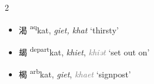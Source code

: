 \begin{multicols}{2}
\begin{itemize}


  \item {\Large{渴}} %
    {\large{{\textsuperscript{aq}}kat}},
    \textit{giet, khat} `thirsty' %



  \item {\Large{朅}} %
    {\large{{\textsuperscript{depart}}kat}},
    \textit{khiet}, \textcolor{gray}{\textit{khiət}} `set out on' %


  \item {\Large{楬}} %
    {\large{{\textsuperscript{arb}}kat}},
    \textit{giet}, \textcolor{gray}{\textit{khaet}} `signpost' %







\end{itemize}
\end{multicols}
